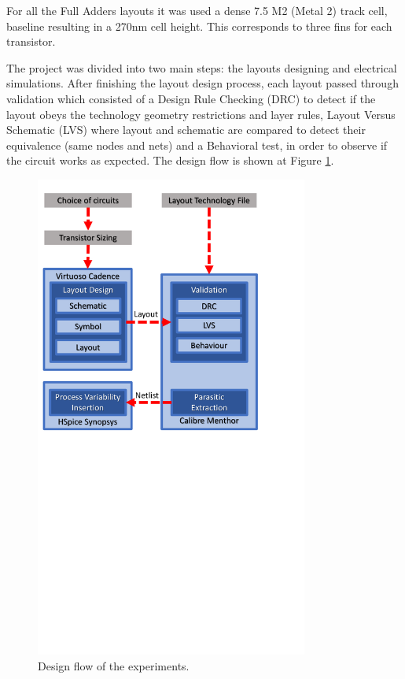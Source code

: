 \documentclass[pgmicro,mestrado,english]{iiufrgs}
\begin{document}
For all the Full Adders layouts it was used a dense 7.5 M2 (Metal 2) track cell, baseline resulting in a 270nm cell height. This corresponds to three fins for each transistor. 


 The project was divided into two main steps: the layouts designing and electrical simulations. After finishing the layout design process, each layout passed through validation which consisted of a Design Rule Checking (DRC) to detect if the layout obeys the technology geometry restrictions and layer rules, Layout Versus Schematic (LVS) where layout and schematic are compared to detect their equivalence (same nodes and nets) and a Behavioral test, in order to observe if the circuit works as expected. The design flow is shown at Figure \ref{DesignFlow}.

\begin{figure}[H]
\centering
\includegraphics[width=0.8\textwidth, trim={0.25cm 16cm 3cm 0.5cm},clip]{designFlow.pdf}
\caption{Design flow of the experiments.}
\label{DesignFlow}
\end{figure}
\end{document}

